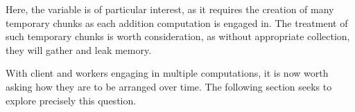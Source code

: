 
Here, the variable  is of particular interest, as it requires
the creation of many temporary chunks as each addition computation is
engaged in. The treatment of such temporary chunks is worth
consideration, as without appropriate collection, they will gather and
leak memory.

With client and workers engaging in multiple computations, it is now
worth asking how they are to be arranged over time. The following
section seeks to explore precisely this question.
